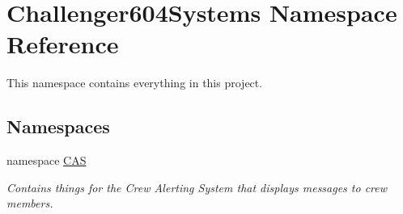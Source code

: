 \hypertarget{namespace_challenger604_systems}{\section{Challenger604\-Systems Namespace Reference}
\label{namespace_challenger604_systems}
}


This namespace contains everything in this project.  


\subsection*{Namespaces}
\begin{DoxyCompactItemize}
\item 
namespace \hyperlink{namespace_challenger604_systems_1_1_c_a_s}{C\-A\-S}
\begin{DoxyCompactList}\small\item\em Contains things for the Crew Alerting System that displays messages to crew members. \end{DoxyCompactList}\end{DoxyCompactItemize}
